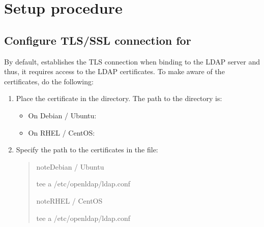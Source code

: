 \documentclass[letterpaper,10pt,english]{sphinxmanual}
\begin{document}
\section{Setup procedure}
\label{\detokenize{ldap-setup:setup-procedure}}

\subsection{Configure TLS/SSL connection for }
\label{\detokenize{ldap-setup:configure-tls-ssl-connection-for-psmdb}}
\sphinxAtStartPar
By default,  establishes the TLS connection when binding to the LDAP server and thus, it requires access to the LDAP  certificates. To make  aware of the certificates, do the following:
\begin{enumerate}
%
\item {} 
\sphinxAtStartPar
Place the certificate in the  directory. The path to the  directory is:
\begin{itemize}
\item {} 
\sphinxAtStartPar
On Debian / Ubuntu: 

\item {} 
\sphinxAtStartPar
On RHEL / CentOS: 

\end{itemize}

\item {} 
\sphinxAtStartPar
Specify the path to the certificates in the  file:
\begin{quote}

\begin{sphinxadmonition}{note}{Debian / Ubuntu}

\begin{sphinxVerbatim}[commandchars=\\\{\}]
tee \PYGZhy{}a /etc/openldap/ldap.conf 
\end{sphinxVerbatim}
\end{sphinxadmonition}

\begin{sphinxadmonition}{note}{RHEL / CentOS}

\begin{sphinxVerbatim}[commandchars=\\\{\}]
tee \PYGZhy{}a /etc/openldap/ldap.conf 
\end{sphinxVerbatim}
\end{sphinxadmonition}
\end{quote}

\end{enumerate}
\end{document}
